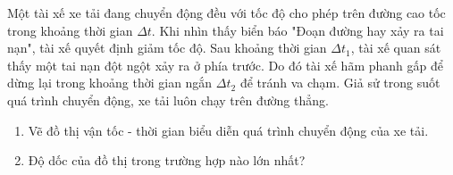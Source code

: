 \begin{ex}
	Một tài xế xe tải đang chuyển động đều với tốc độ cho phép trên đường cao tốc trong khoảng thời gian $\Delta t$. Khi nhìn thấy biển báo "Đoạn đường hay xảy ra tai nạn", tài xế quyết định giảm tốc độ. Sau khoảng thời gian $\Delta t_1$, tài xế quan sát thấy một tai nạn đột ngột xảy ra ở phía trước. Do đó tài xế hãm phanh gấp để dừng lại trong khoảng thời gian ngắn $\Delta t_2$ để tránh va chạm. Giả sử trong suốt quá trình chuyển động, xe tải luôn chạy trên đường thẳng.
	\begin{enumerate}[label=\alph*)]
		\item Vẽ đồ thị vận tốc - thời gian biểu diễn quá trình chuyển động của xe tải.
		\item Độ dốc của đồ thị trong trường hợp nào lớn nhất?
	\end{enumerate}
\end{ex}

